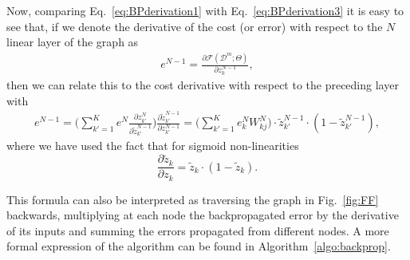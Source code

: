 %
Now, comparing Eq.~\ref{eq:BPderivation1} with Eq.~\ref{eq:BPderivation3} it is easy to see that, if we denote the derivative of the cost (or error) with respect to the $N$ linear layer of the graph as
%
\begin{align}
e^{N-1} = \frac{\partial \mathcal{F}(\mathcal{D}^m;\Theta)}{\partial z_{k}^{N-1}} ,
\label{eq:BPderivation4}
\end{align}
%
\noindent then we can relate this to the cost derivative with respect to the preceding layer with
%
\begin{align}
e^{N-1} = \bigg(\sum_{k'=1}^{K} e^N \frac{\partial z_{k'}^{N}}{\partial \tilde{z}_{k'}^{N-1}}\bigg)\frac{\partial \tilde{z}_{k'}^{N-1}}{\partial z_{k'}^{N-1}} = \bigg(\sum_{k'=1}^{K} e^N_k W^N_{kj}\bigg)\cdot\tilde{z}_{k'}^{N-1}\cdot(1-\tilde{z}_{k'}^{N-1}),
\label{eq:chainRulRecursion}
\end{align}
%
where we have used the fact that for sigmoid non-linearities 
%
\begin{equation}
\frac{\partial \tilde{z}_{k}}{\partial z_{k}} = \tilde{z}_{k}\cdot (1-\tilde{z}_{k}).
\end{equation}

This formula can also be interpreted as traversing the graph in Fig.~\ref{fig:FF} backwards, multiplying at each node the backpropagated error by the derivative of its inputs and summing the errors propagated from different nodes. A more formal expression of the algorithm can be found in Algorithm~\ref{algo:backprop}.

